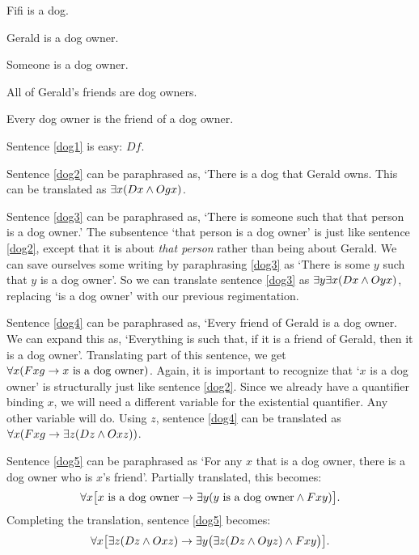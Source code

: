 \begin{earg}
\item[\ex{dog1}] Fifi is a dog.
\item[\ex{dog2}] Gerald is a dog owner.
\item[\ex{dog3}] Someone is a dog owner.
\item[\ex{dog4}] All of Gerald's friends are dog owners.
\item[\ex{dog5}] Every dog owner is the friend of a dog owner.
\end{earg}

Sentence \ref{dog1} is easy: $Df$.

Sentence \ref{dog2} can be paraphrased as, `There is a dog that Gerald owns.
This can be translated as $\exists x(Dx \wedge Ogx)$.

Sentence \ref{dog3} can be paraphrased as, `There is someone such that that person is a dog owner.'
The subsentence `that person is a dog owner' is just like sentence \ref{dog2}, except that it is about \textit{that person} rather than being about Gerald.
We can save ourselves some writing by paraphrasing \ref{dog3} as `There is some $y$ such that $y$ is a dog owner'.
So we can translate sentence \ref{dog3} as $\exists y \exists x(Dx \wedge Oyx)$, replacing `is a dog owner' with our previous regimentation. 

Sentence \ref{dog4} can be paraphrased as, `Every friend of Gerald is a dog owner.
We can expand this as, `Everything is such that, if it is a friend of Gerald, then it is a dog owner'.
Translating part of this sentence, we get $\forall x(Fxg \rightarrow\mbox{$x$ is a dog owner})$.
Again, it is important to recognize that `$x$ is a dog owner' is structurally just like sentence \ref{dog2}.
Since we already have a quantifier binding $x$, we will need a different variable for the existential quantifier.
Any other variable will do.
Using $z$, sentence \ref{dog4} can be translated as $\forall x(Fxg \rightarrow\exists z(Dz \wedge Oxz))$.

Sentence \ref{dog5} can be paraphrased as `For any $x$ that is a dog owner, there is a dog owner who is $x$'s friend'.
Partially translated, this becomes: 
  $$\forall x\bigl[\mbox{$x$ is a dog owner}\rightarrow\exists y(\mbox{$y$ is a dog owner}\wedge Fxy)\bigr].$$
Completing the translation, sentence \ref{dog5} becomes: 
  $$\forall x\bigl[\exists z(Dz \wedge Oxz)\rightarrow\exists y\bigl(\exists z(Dz \wedge Oyz)\wedge Fxy\bigr)\bigr].$$

